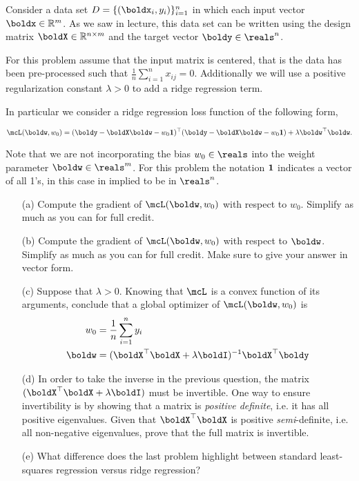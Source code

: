 \documentclass[submit]{harvardml}
\begin{document}
\begin{problem}

  Consider a data set $D = \{(\boldx_i, y_i)\}_{i=1}^n$ in which each
  input vector $\boldx \in \mathbb{R}^m$. As we saw in lecture, this
  data set can be written using the design matrix $\boldX \in
  \mathbb{R}^{n \times m}$ and the target vector $\boldy \in \reals^n$.
  
  
  For this problem assume that the input matrix is centered, that is
  the data has been pre-processed such that $\frac{1}{n} \sum_{i=1}^n
  x_{ij} = 0 $.  Additionally we will use a positive regularization
  constant $\lambda > 0$ to add a ridge regression term.

  In particular we consider a ridge regression loss function of the following form,

\[\mcL(\boldw, w_0) = (\boldy - \boldX \boldw - w_0 {\bf 1 })^\top (\boldy - \boldX
\boldw - w_0 {\bf 1 }) + \lambda \boldw^\top \boldw .\]

 Note that we are not incorporating the bias $w_0\in \reals$ into the weight parameter $\boldw \in \reals^m$.
 For this problem the notation ${\bf 1}$ indicates a vector of all 1's, in this case in implied to be in $\reals^n$.  


\begin{itemize}
  \item[(a)] Compute the gradient of $\mcL(\boldw, w_0)$ with respect to $w_0$.
    Simplify as much as you can for full credit.
  \item[(b)] Compute the gradient of $\mcL(\boldw, w_0)$ with respect to $\boldw$.
    Simplify as much as you can for full credit. Make sure to give your answer
    in vector form.
  \item[(c)] Suppose that $\lambda > 0$. Knowing that $\mcL$ is a convex function
    of its arguments, conclude that a global optimizer of
    $\mcL(\boldw, w_0)$ is
    \begin{align}
      w_0 &= \frac{1}{n} \sum_{i=1}^n y_i \\
      \boldw &= (\boldX^\top \boldX + \lambda \boldI)^{-1} \boldX^\top \boldy
    \end{align}
  \item[(d)] In order to take the inverse in the previous question, the
    matrix $(\boldX^\top \boldX + \lambda \boldI)$ must be invertible.
    One way to ensure invertibility is by showing that a matrix is
    \textit{positive definite}, i.e. it has all positive
    eigenvalues. Given that $\boldX^\top\boldX$ is positive
    \textit{semi}-definite, i.e.  all non-negative eigenvalues, prove that the
    full matrix is invertible.

  \item[(e)] What difference does the last problem highlight between standard least-squares regression versus ridge regression?
    

\end{itemize}
\end{problem}
\end{document}
